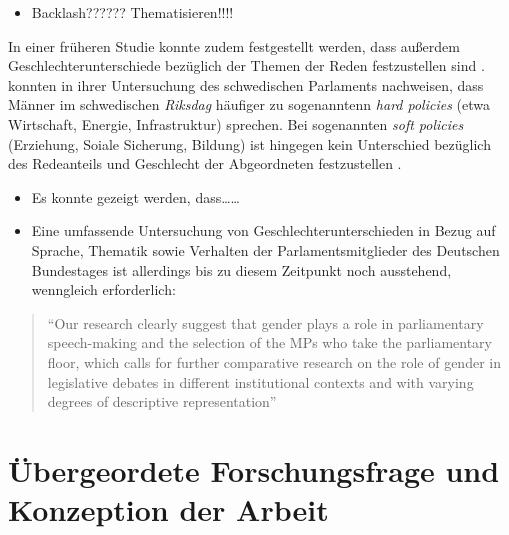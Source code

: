 \documentclass[12pt, 
    twoside=false, 
    bibliography=totoc, 
    numbers=endperiod, 
    headings=normal, 
    toc=chapterentrydotfill
    ]{scrbook}
\begin{document}
\begin{itemize}
\item Backlash?????? Thematisieren!!!!
\end{itemize}

In einer früheren Studie konnte zudem festgestellt werden, dass außerdem Geschlechterunterschiede bezüglich der Themen der Reden festzustellen sind \parencite[514f.]{back_2014}. \textcite{back_2014} konnten in ihrer Untersuchung des schwedischen Parlaments nachweisen, dass Männer im schwedischen \emph{Riksdag} häufiger zu sogenanntenn \emph{hard policies} (etwa Wirtschaft, Energie, Infrastruktur) sprechen. Bei sogenannten \emph{soft policies} (Erziehung, Soiale Sicherung, Bildung) ist hingegen kein Unterschied bezüglich des Redeanteils und Geschlecht der Abgeordneten festzustellen \parencite[514f.]{back_2014}. 

\begin{itemize}
\item Es konnte gezeigt werden, dass…… 


\item Eine umfassende Untersuchung von Geschlechterunterschieden in Bezug auf Sprache, Thematik sowie Verhalten der Parlamentsmitglieder des Deutschen Bundestages ist allerdings bis zu diesem Zeitpunkt noch ausstehend, wenngleich erforderlich: 
\end{itemize}

\citereset
\begin{quote}
 \enquote{Our research clearly suggest that gender plays a role in parliamentary speech-making and the selection of the MPs who take the parliamentary floor, which calls for further comparative research on the role of gender in legislative  debates in different institutional contexts and with varying degrees of descriptive representation}
  \parencite[515]{back_2014}
\end{quote}




\chapter{Übergeordete Forschungsfrage und Konzeption der Arbeit}
\end{document}
